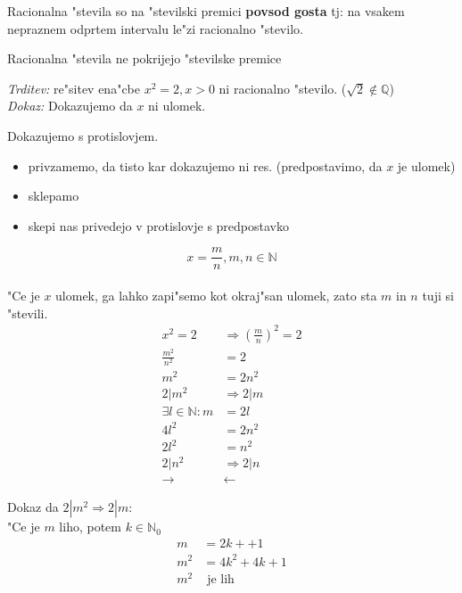 Racionalna "stevila so na "stevilski premici \textbf{povsod gosta} tj: na vsakem nepraznem odprtem intervalu le"zi racionalno "stevilo.

Racionalna "stevila ne pokrijejo "stevilske premice

\emph{Trditev:} re"sitev ena"cbe \(x^2 = 2, x > 0\) ni racionalno "stevilo. (\(\sqrt{2} \notin \mathbb{Q}\))\\
\emph{Dokaz:} Dokazujemo da \(x\) ni ulomek.

Dokazujemo s protislovjem.
\begin{itemize}
	\item privzamemo, da tisto kar dokazujemo ni res. (predpostavimo, da \(x\) je ulomek)
	\item sklepamo
	\item skepi nas privedejo v protislovje s predpostavko
\end{itemize}
\[x = \frac{m}{n}, m, n \in \mathbb{N}\]\\
"Ce je \(x\) ulomek, ga lahko zapi"semo kot okraj"san ulomek, zato sta \(m\) in \(n\) tuji si "stevili.
\begin{align*}
	x^2 = 2 &\Rightarrow (\frac{m}{n})^2 = 2\\
	\frac{m^2}{n^2} &= 2\\
	m^2 &= 2n^2\\
	2 | m^2 &\Rightarrow 2 | m\\
	\exists l \in \mathbb{N}: m &= 2l\\
	4l^2 &= 2n^2\\
	2l^2 &= n^2\\
	2 | n^2 &\Rightarrow 2 | n\\
	\rightarrow&\leftarrow
\end{align*}

Dokaz da \(2 | m^2 \Rightarrow 2 | m\):\\
"Ce je \(m\) liho, potem \(k \in \mathbb{N}_0\)
\begin{align*}
	m &= 2k+ + 1\\
	m^2 &= 4k^2 + 4k + 1\\
	m^2 &\text{ je lih}
\end{align*}
